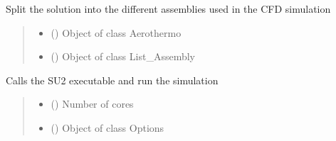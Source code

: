 \documentclass[letterpaper,10pt,english]{sphinxmanual}
\begin{document}

\begin{fulllineitems}
\label{\detokenize{modules:su2.split_aerothermo}}
\pysigstartsignatures
{}
\pysigstopsignatures
\sphinxAtStartPar
Split the solution into the different assemblies used in the CFD simulation
\begin{quote}\begin{description}
\begin{itemize}
\item {} 
\sphinxAtStartPar
{} ({\hyperref[\detokenize{modules:configuration.Aerothermo}]{}}) \textendash{} Object of class Aerothermo

\item {} 
\sphinxAtStartPar
{} () \textendash{} Object of class List\_Assembly

\end{itemize}

\end{description}\end{quote}

\end{fulllineitems}


\begin{fulllineitems}
\label{\detokenize{modules:su2.run_SU2}}
\pysigstartsignatures
{}
\pysigstopsignatures
\sphinxAtStartPar
Calls the SU2 executable and run the simulation
\begin{quote}\begin{description}
\begin{itemize}
\item {} 
\sphinxAtStartPar
{} () \textendash{} Number of cores

\item {} 
\sphinxAtStartPar
{} ({\hyperref[\detokenize{modules:configuration.Options}]{}}) \textendash{} Object of class Options

\end{itemize}

\end{description}\end{quote}

\end{fulllineitems}
\end{document}
